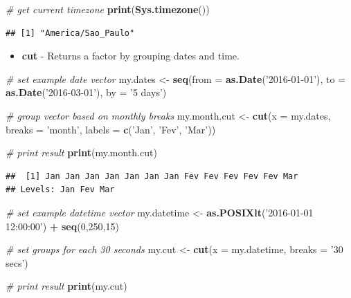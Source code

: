 \documentclass[11pt,]{book}
\newenvironment{Shaded}{\begin{snugshade}}{\end{snugshade}}
\newcommand{\KeywordTok}[1]{\textcolor[rgb]{0.27,0.27,0.27}{\textbf{#1}}}
\newcommand{\DataTypeTok}[1]{\textcolor[rgb]{0.27,0.27,0.27}{#1}}
\newcommand{\DecValTok}[1]{\textcolor[rgb]{0.06,0.06,0.06}{#1}}
\newcommand{\StringTok}[1]{\textcolor[rgb]{0.5,0.5,0.5}{#1}}
\newcommand{\CommentTok}[1]{\textcolor[rgb]{0.56,0.35,0.01}{\textit{#1}}}
\newcommand{\OperatorTok}[1]{\textcolor[rgb]{0.81,0.36,0.00}{\textbf{#1}}}
\newcommand{\NormalTok}[1]{#1}
\providecommand{\tightlist}{%
  \setlength{\itemsep}{0pt}\setlength{\parskip}{0pt}}
\begin{document}
\begin{Shaded}
\begin{Highlighting}[]
\CommentTok{# get current timezone}
\KeywordTok{print}\NormalTok{(}\KeywordTok{Sys.timezone}\NormalTok{())}
\end{Highlighting}
\end{Shaded}

\begin{verbatim}
## [1] "America/Sao_Paulo"
\end{verbatim}

\begin{itemize}
\tightlist
\item
  \textbf{cut} - Returns a factor by grouping dates and time.
\end{itemize}

\begin{Shaded}
\begin{Highlighting}[]
\CommentTok{# set example date vector}
\NormalTok{my.dates <-}\StringTok{ }\KeywordTok{seq}\NormalTok{(}\DataTypeTok{from =} \KeywordTok{as.Date}\NormalTok{(}\StringTok{'2016-01-01'}\NormalTok{), }
                \DataTypeTok{to =} \KeywordTok{as.Date}\NormalTok{(}\StringTok{'2016-03-01'}\NormalTok{), }
                \DataTypeTok{by =} \StringTok{'5 days'}\NormalTok{)}

\CommentTok{# group vector based on monthly breaks}
\NormalTok{my.month.cut <-}\StringTok{ }\KeywordTok{cut}\NormalTok{(}\DataTypeTok{x =}\NormalTok{ my.dates, }
                    \DataTypeTok{breaks =} \StringTok{'month'}\NormalTok{, }
                    \DataTypeTok{labels =} \KeywordTok{c}\NormalTok{(}\StringTok{'Jan'}\NormalTok{, }\StringTok{'Fev'}\NormalTok{, }\StringTok{'Mar'}\NormalTok{))}

\CommentTok{# print result}
\KeywordTok{print}\NormalTok{(my.month.cut)}
\end{Highlighting}
\end{Shaded}

\begin{verbatim}
##  [1] Jan Jan Jan Jan Jan Jan Jan Fev Fev Fev Fev Fev Mar
## Levels: Jan Fev Mar
\end{verbatim}

\begin{Shaded}
\begin{Highlighting}[]
\CommentTok{# set example datetime vector}
\NormalTok{my.datetime <-}\StringTok{ }\KeywordTok{as.POSIXlt}\NormalTok{(}\StringTok{'2016-01-01 12:00:00'}\NormalTok{) }\OperatorTok{+}\StringTok{ }\KeywordTok{seq}\NormalTok{(}\DecValTok{0}\NormalTok{,}\DecValTok{250}\NormalTok{,}\DecValTok{15}\NormalTok{)}

\CommentTok{# set groups for each 30 seconds}
\NormalTok{my.cut <-}\StringTok{ }\KeywordTok{cut}\NormalTok{(}\DataTypeTok{x =}\NormalTok{ my.datetime, }\DataTypeTok{breaks =} \StringTok{'30 secs'}\NormalTok{)}

\CommentTok{# print result}
\KeywordTok{print}\NormalTok{(my.cut)}
\end{Highlighting}
\end{Shaded}
\end{document}
